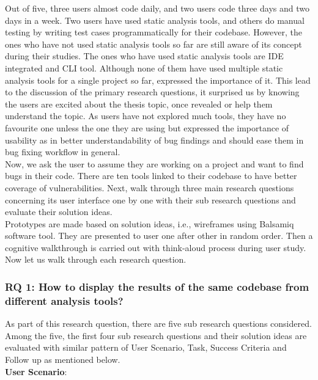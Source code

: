 Out of five, three users almost code daily, and two users code three days and two days in a week. Two users have used static analysis tools, and others do manual testing by writing test cases programmatically for their codebase. However, the ones who have not used static analysis tools so far are still aware of its concept during their studies.  The ones who have used static analysis tools are IDE integrated and CLI tool. Although none of them have used multiple static analysis tools for a single project so far, expressed the importance of it. This lead to the discussion of the primary research questions, it surprised us by knowing the users are excited about the thesis topic, once revealed or help them understand the topic. As users have not explored much tools, they have no favourite one unless the one they are using but expressed the importance of usability as in better understandability of bug findings and should ease them in bug fixing workflow in general. \\

Now, we ask the user to assume they are working on a project and want to find bugs in their code. There are ten tools linked to their codebase to have better coverage of vulnerabilities. Next, walk through three main research questions concerning its user interface one by one with their sub research questions and evaluate their solution ideas. \\

Prototypes are made based on solution ideas, i.e., wireframes using Balsamiq software tool. They are presented to user one after other in random order. Then a cognitive walkthrough is carried out with think-aloud process during user study. \\

Now let us walk through each research question. 

\subsubsection{RQ 1: How to display the results of the same codebase from different analysis tools?}

As part of this research question, there are five sub research questions considered. Among the five, the first four sub research questions and their solution ideas are evaluated with similar pattern of User Scenario, Task, Success Criteria and Follow up as mentioned below. \\

\clearpage
\textbf{User Scenario}: \\

